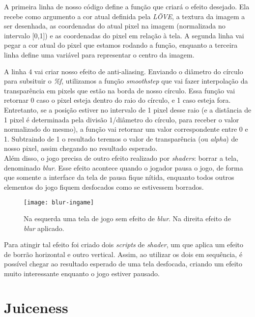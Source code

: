 A primeira linha de nosso código define a função que criará o efeito desejado. Ela recebe como argumento a cor atual definida pela \textit{LÖVE}, a textura da imagem a ser desenhada, as coordenadas do atual pixel na imagem (normalizada no intervalo [0,1]) e as coordenadas do pixel em relação à tela. A segunda linha vai pegar a cor atual do pixel que estamos rodando a função,
enquanto a terceira linha define uma variável para representar o centro da imagem.

A linha 4 vai criar nosso efeito de anti-aliasing. Enviando o diâmetro do círculo para subsituir o \textit{\%f}, utilizamos a função \textit{smoothstep} que vai fazer interpolação da transparência em pixels que estão na borda de nosso círculo. Essa função vai retornar 0 caso o pixel esteja dentro do raio do círculo, e 1 caso esteja fora. Entretanto, se a posição estiver no intervalo de 1 pixel desse raio (e a distância de 1 pixel é determinada pela divisão 1/diâmetro do círculo, para receber o valor normalizado do mesmo), a função vai retornar um valor correspondente entre 0 e 1. Subtraindo de 1 o resultado teremos o valor de transparência (ou \textit{alpha}) de nosso pixel, assim chegando no resultado esperado.\\


Além disso, o jogo precisa de outro efeito realizado por \textit{shaders}: borrar a tela, denominado \textit{blur}. Esse efeito acontece quando o jogador pausa o jogo, de forma que somente a interface da tela de pausa fique nítida, enquanto todos outros elementos do jogo fiquem desfocados como se estivessem borrados.

\begin{figure}[h]
\texttt{[image: blur-ingame]}
\centering
\caption{Na esquerda uma tela de jogo sem efeito de \textit{blur}. Na direita efeito de \textit{blur} aplicado.}
\end{figure}

Para atingir tal efeito foi criado dois \textit{scripts} de \textit{shader}, um que aplica um efeito de borrão horizontal e outro vertical. Assim, ao utilizar os dois em sequência, é possível chegar ao resultado esperado de uma tela desfocada, criando um efeito muito interessante enquanto o jogo estiver pausado.


\section{Juiceness}
\label{sec:juiceness}

